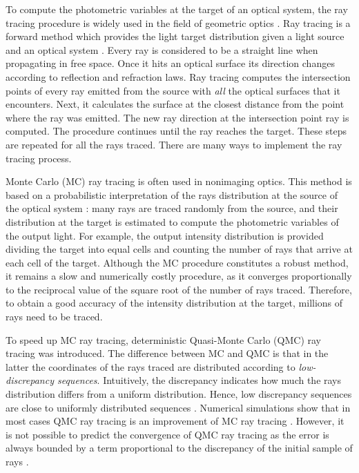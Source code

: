 To compute the photometric variables at the target of an
optical system, the ray tracing procedure is widely used in the field of geometric optics \cite{glassner1989introduction}.
Ray tracing is a forward method which provides the light target distribution given a light source and an optical system \cite{Gross2005Handbook}. Every ray is considered to be a straight line when propagating in free space. Once it hits an optical surface its direction changes according to reflection and refraction laws. Ray tracing computes the intersection points of every ray emitted from the source with \textit{all} the optical surfaces that it encounters. Next, it calculates the surface at the closest distance from the point where the ray was emitted. The new ray direction at the intersection point ray is computed. The procedure continues until the ray reaches the target. These steps are repeated for all the rays traced.
There are many ways to implement the ray tracing process.

Monte Carlo (MC) ray tracing is often used in nonimaging
optics. This method is based on a probabilistic interpretation
of the rays distribution at the source of the optical
system \cite{liu2010precise,Ting:1}: many rays are traced randomly from the source,
and their distribution at the target is estimated to compute the
photometric variables of the output light. For example, the output intensity distribution is provided dividing the target into equal cells and counting the number of rays that arrive at each cell of the target. Although the MC
procedure constitutes a robust method, it remains a slow and
numerically costly procedure, as it converges proportionally
to the reciprocal value of the square root of the number of rays
traced. Therefore, to obtain a good accuracy of the intensity distribution at the target, millions of rays need to be traced.

To speed up MC ray tracing, deterministic Quasi-Monte Carlo (QMC) ray tracing was introduced. The difference between MC and QMC is that in the latter the coordinates of the rays traced are distributed according to \textit{low-discrepancy sequences}. Intuitively, the discrepancy indicates how much the rays distribution differs from a uniform distribution.  Hence, low discrepancy sequences are close to uniformly distributed sequences \cite{levy2002introduction}.
Numerical simulations show that in most cases QMC ray tracing is an improvement of MC ray tracing \cite{ohbuchi1996quasi, caflisch1998monte}. However, it is not possible to predict the convergence of QMC ray tracing as the error is always bounded by a term proportional to the discrepancy of the initial sample of rays \cite{tuffin2004randomization}.

